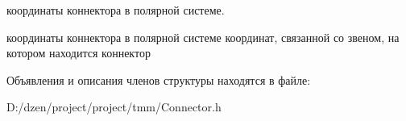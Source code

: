 координаты коннектора в полярной системе. 

координаты коннектора в полярной системе координат, связанной со звеном, на котором находится коннектор 

Объявления и описания членов структуры находятся в файле:\begin{DoxyCompactItemize}
\item 
D:/dzen/project/project/tmm/Connector.h\end{DoxyCompactItemize}

